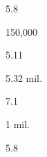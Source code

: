 \begin{description}[font=\normalfont,style=nextline]
 \begin{multicols}{2}\begin{description}[font=\normalfont\itshape,noitemsep] 
 \item[] 
 \item[\pbnumberabbr] 5.8 
 \item[\family] \famNigerCongo 
 \item[]
 \item[]
\item[\nativespeakers] 150,000 
 \item[\region] \regionDRC 
 \end{description}\end{multicols}
\item[\langnameNorwegian] 
 \begin{multicols}{2}\begin{description}[font=\normalfont\itshape,noitemsep] 
 \item[] 
 \item[\pbnumberabbr] 5.11 
 \item[\family] \famIndoEuropean 
 \item[]
\item[\nativespeakers] 5.32 mil. 
 \item[\region] \regionNorway 
 \end{description}\end{multicols}
\item[\langnameNung] 
 \begin{multicols}{2}\begin{description}[font=\normalfont\itshape,noitemsep] 
 \item[] 
 \item[\pbnumberabbr] 7.1 
 \item[\family] \famKraDai 
 \item[]
\item[\nativespeakers] 1 mil. 
 \item[\region] \regionVietnam 
 \end{description}\end{multicols}
\largerpage[1]
 \item[\langnameNupe] 
 \begin{multicols}{2}\begin{description}[font=\normalfont\itshape,noitemsep] 
 \item[] 
 \item[\pbnumberabbr] 5.8 
 \item[\family] \famNigerCongo 
 \item[]

\end{description}
\end{multicols}
\end{description}

